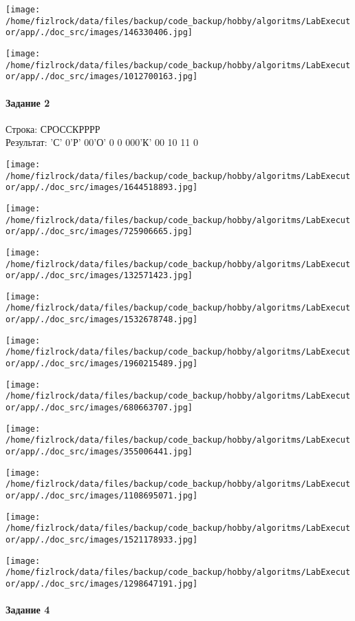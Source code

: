 \documentclass[a4paper, 12pt]{article}
\begin{document}
\texttt{[image: /home/fizlrock/data/files/backup/code\_backup/hobby/algoritms/LabExecutor/app/./doc\_src/images/146330406.jpg]}

\texttt{[image: /home/fizlrock/data/files/backup/code\_backup/hobby/algoritms/LabExecutor/app/./doc\_src/images/1012700163.jpg]}
\pagebreak
\paragraph{Задание 2}

Строка: 
СРОССКРРРР\\
Результат: 'С' 0'Р' 00'О' 0 0 000'К' 00 10 11 0

\texttt{[image: /home/fizlrock/data/files/backup/code\_backup/hobby/algoritms/LabExecutor/app/./doc\_src/images/1644518893.jpg]}

\texttt{[image: /home/fizlrock/data/files/backup/code\_backup/hobby/algoritms/LabExecutor/app/./doc\_src/images/725906665.jpg]}

\texttt{[image: /home/fizlrock/data/files/backup/code\_backup/hobby/algoritms/LabExecutor/app/./doc\_src/images/132571423.jpg]}

\texttt{[image: /home/fizlrock/data/files/backup/code\_backup/hobby/algoritms/LabExecutor/app/./doc\_src/images/1532678748.jpg]}

\texttt{[image: /home/fizlrock/data/files/backup/code\_backup/hobby/algoritms/LabExecutor/app/./doc\_src/images/1960215489.jpg]}

\texttt{[image: /home/fizlrock/data/files/backup/code\_backup/hobby/algoritms/LabExecutor/app/./doc\_src/images/680663707.jpg]}

\texttt{[image: /home/fizlrock/data/files/backup/code\_backup/hobby/algoritms/LabExecutor/app/./doc\_src/images/355006441.jpg]}

\texttt{[image: /home/fizlrock/data/files/backup/code\_backup/hobby/algoritms/LabExecutor/app/./doc\_src/images/1108695071.jpg]}

\texttt{[image: /home/fizlrock/data/files/backup/code\_backup/hobby/algoritms/LabExecutor/app/./doc\_src/images/1521178933.jpg]}

\texttt{[image: /home/fizlrock/data/files/backup/code\_backup/hobby/algoritms/LabExecutor/app/./doc\_src/images/1298647191.jpg]}
\pagebreak
\paragraph{Задание 4}
\end{document}
